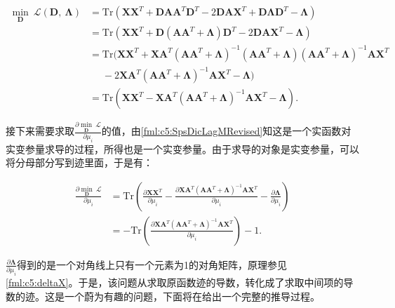 \begin{equation}\label{fml:c5:SpsDicLagMRevised}
	\begin{aligned}
		\min\limits_{\mathbf{D}}~\mathcal{L}(\mathbf{D},~\bm{\Lambda}) &= \mathrm{Tr}(\mathbf{X}\mathbf{X}^T + \mathbf{D}\mathbf{A}\mathbf{A}^T\mathbf{D}^T -  2\mathbf{D}\mathbf{A}\mathbf{X}^T + \mathbf{D}\bm{\Lambda}\mathbf{D}^T - \bm{\Lambda})\\
		&= \mathrm{Tr}(\mathbf{X}\mathbf{X}^T + \mathbf{D}(\mathbf{A}\mathbf{A}^T+\bm{\Lambda})\mathbf{D}^T -  2\mathbf{D}\mathbf{A}\mathbf{X}^T - \bm{\Lambda})\\
		&= \mathrm{Tr}(\mathbf{X}\mathbf{X}^T + \mathbf{X}\mathbf{A}^T(\mathbf{A}\mathbf{A}^T+\bm{\Lambda})^{-1}(\mathbf{A}\mathbf{A}^T+\bm{\Lambda})(\mathbf{A}\mathbf{A}^T+\bm{\Lambda})^{-1}\mathbf{A}\mathbf{X}^T \\
		&~~~~~~- 2\mathbf{X}\mathbf{A}^T(\mathbf{A}\mathbf{A}^T + \bm{\Lambda})^{-1}\mathbf{A}\mathbf{X}^T - \bm{\Lambda})\\
		&= \mathrm{Tr}(\mathbf{X}\mathbf{X}^T - \mathbf{X}\mathbf{A}^T(\mathbf{A}\mathbf{A}^T+\bm{\Lambda})^{-1}\mathbf{A}\mathbf{X}^T - \bm{\Lambda}).
	\end{aligned}
\end{equation}

接下来需要求取$\frac{\partial \min\limits_{\mathbf{D}}~\mathcal{L}}{\partial \mu_i}$的值，由\eqref{fml:c5:SpsDicLagMRevised}知这是一个实函数对实变参量求导的过程，所得也是一个实变参量。由于求导的对象是实变参量，可以将分母部分写到迹里面，于是有：

\begin{equation}\label{fml:c5:SpsDictLMRPar1}
	\begin{aligned}
		\frac{\partial \min\limits_{\mathbf{D}}~\mathcal{L}}{\partial \mu_i} &= \mathrm{Tr}\left( \frac{\partial \mathbf{X}\mathbf{X}^T}{\partial \mu_i} - \frac{ \partial \mathbf{X}\mathbf{A}^T(\mathbf{A}\mathbf{A}^T+\bm{\Lambda})^{-1}\mathbf{A}\mathbf{X}^T}{ \partial \mu_i } - \frac{\partial\bm{\Lambda}}{\partial \mu_i} \right)\\
		&= -\mathrm{Tr}\left( \frac{ \partial \mathbf{X}\mathbf{A}^T(\mathbf{A}\mathbf{A}^T+\bm{\Lambda})^{-1}\mathbf{A}\mathbf{X}^T }{ \partial \mu_i } \right) - 1.
	\end{aligned}
\end{equation}

$\frac{\partial\bm{\Lambda}}{\partial \mu_i}$得到的是一个对角线上只有一个元素为1的对角矩阵，原理参见\eqref{fml:c5:deltaX}。于是，该问题从求取原函数迹的导数，转化成了求取中间项的导数的迹。这是一个蔚为有趣的问题，下面将在给出一个完整的推导过程。


